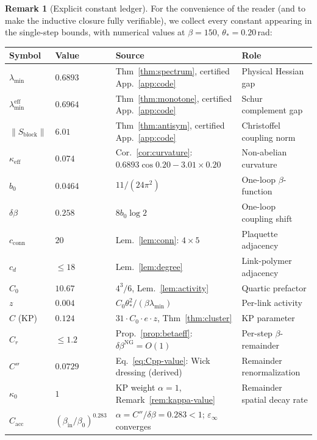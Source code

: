 \documentclass[11pt]{article}
\theoremstyle{definition}
\newtheorem{remark}[theorem]{Remark}
\begin{document}
\begin{remark}[Explicit constant ledger]\label{rem:constant-ledger}
For the convenience of the reader (and to make the inductive closure
fully verifiable), we collect every constant appearing in the
single-step bounds, with numerical values at $\beta=150$,
$\theta_*=0.20$\,rad:

\begin{center}
\renewcommand{\arraystretch}{1.15}
\begin{tabular}{lllp{5cm}}
\toprule
\textbf{Symbol} & \textbf{Value} & \textbf{Source} & \textbf{Role}\\
\midrule
$\lambda_{\min}$ & $0.6893$ &
Thm~\ref{thm:spectrum}, certified App.~\ref{app:code}
& Physical Hessian gap\\
$\lambda_{\min}^{\mathrm{eff}}$ & $0.6964$ &
Thm~\ref{thm:monotone}, certified App.~\ref{app:code}
& Schur complement gap\\
$\|S_{\mathrm{block}}\|$ & $6.01$ &
Thm~\ref{thm:antisym}, certified App.~\ref{app:code}
& Christoffel coupling norm\\
$\kappa_{\mathrm{eff}}$ & $0.074$ &
Cor.~\ref{cor:curvature}: $0.6893\cos0.20-3.01\times0.20$
& Non-abelian curvature\\
$b_0$ & $0.0464$ & $11/(24\pi^2)$ & One-loop $\beta$-function\\
$\delta\beta$ & $0.258$ & $8b_0\log 2$ & One-loop coupling shift\\
$c_{\mathrm{conn}}$ & $20$ & Lem.~\ref{lem:conn}: $4\times 5$
& Plaquette adjacency\\
$c_d$ & $\le 18$ & Lem.~\ref{lem:degree}
& Link-polymer adjacency\\
$C_0$ & $10.67$ & $4^3/6$, Lem.~\ref{lem:activity}
& Quartic prefactor\\
$z$ & $0.004$ & $C_0\theta_*^2/(\beta\lambda_{\min})$
& Per-link activity\\
$C$ (KP) & $0.124$ & $31\cdot C_0\cdot e\cdot z$, Thm~\ref{thm:cluster}
& KP parameter\\
$C_r$ & $\le 1.2$ & Prop.~\ref{prop:betaeff}: $\delta\beta^{\mathrm{NG}}=O(1)$
& Per-step $\beta$-remainder\\
$C''$ & $0.0729$ & Eq.~\eqref{eq:Cpp-value}: Wick dressing (derived)
& Remainder renormalization\\
$\kappa_0$ & $1$ & KP weight $\alpha=1$,
Remark~\ref{rem:kappa-value}
& Remainder spatial decay rate\\
$C_{\mathrm{acc}}$ & $(\beta_{\mathrm{in}}/\beta_0)^{0.283}$ & $\alpha=C''/\delta\beta=0.283<1$; $\varepsilon_\infty$ converges

\end{tabular}
\end{center}
\end{remark}
\end{document}
